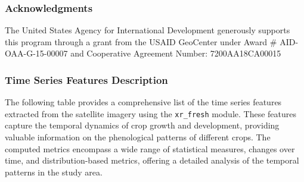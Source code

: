 \documentclass[
  journal,
  twocolumn]{IEEEtran}
\begin{document}
\hypertarget{acknowledgments}{%
\subsubsection{Acknowledgments}\label{acknowledgments}}

The United States Agency for International Development generously
supports this program through a grant from the USAID GeoCenter under
Award \# AID-OAA-G-15-00007 and Cooperative Agreement Number:
7200AA18CA00015

\hypertarget{time-series-features-description}{%
\subsubsection{Time Series Features
Description}\label{time-series-features-description}}

The following table provides a comprehensive list of the time series
features extracted from the satellite imagery using the
\texttt{xr\_fresh} module. These features capture the temporal dynamics
of crop growth and development, providing valuable information on the
phenological patterns of different crops. The computed metrics encompass
a wide range of statistical measures, changes over time, and
distribution-based metrics, offering a detailed analysis of the temporal
patterns in the study area.
\end{document}

